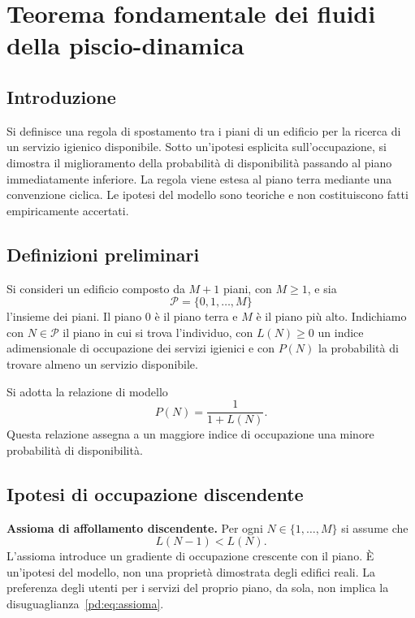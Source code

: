 \chapter{Teorema fondamentale dei fluidi della piscio-dinamica}
\section*{Introduzione}
Si definisce una regola di spostamento tra i piani di un edificio per la ricerca di un servizio igienico disponibile. Sotto un'ipotesi esplicita sull'occupazione, si dimostra il miglioramento della probabilità di disponibilità passando al piano immediatamente inferiore. La regola viene estesa al piano terra mediante una convenzione ciclica. Le ipotesi del modello sono teoriche e non costituiscono fatti empiricamente accertati.


\section{Definizioni preliminari}
Si consideri un edificio composto da $M+1$ piani, con $M\geq 1$, e sia
\[
\mathcal{P}=\{0,1,\ldots,M\}
\]
l'insieme dei piani. Il piano $0$ è il piano terra e $M$ è il piano più alto. Indichiamo con $N\in\mathcal{P}$ il piano in cui si trova l'individuo, con $L(N)\geq 0$ un indice adimensionale di occupazione dei servizi igienici e con $P(N)$ la probabilità di trovare almeno un servizio disponibile.

Si adotta la relazione di modello
\begin{equation}\label{pd:eq:probabilita}
P(N)=\frac{1}{1+L(N)}.
\end{equation}
Questa relazione assegna a un maggiore indice di occupazione una minore probabilità di disponibilità.

\section{Ipotesi di occupazione discendente}
\noindent\textbf{Assioma di affollamento discendente.} Per ogni $N\in\{1,\ldots,M\}$ si assume che
\begin{equation}\label{pd:eq:assioma}
L(N-1)<L(N).
\end{equation}
L'assioma introduce un gradiente di occupazione crescente con il piano. È un'ipotesi del modello, non una proprietà dimostrata degli edifici reali. La preferenza degli utenti per i servizi del proprio piano, da sola, non implica la disuguaglianza~\eqref{pd:eq:assioma}.

